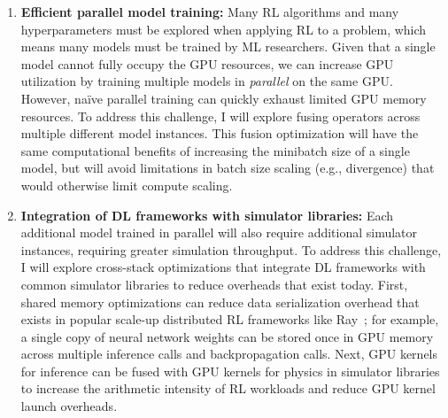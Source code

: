 \documentclass[letterpaper,11pt]{article}
\begin{document}
\begin{enumerate}[leftmargin=*]
	\item \textbf{Efficient parallel model training:} 
            Many RL algorithms and many hyperparameters must be explored when applying RL to a problem, which means many models must be trained by ML researchers.  
            Given that a single model cannot fully occupy the GPU resources, we can increase GPU utilization by training multiple models in \emph{parallel} on the same GPU.  
            However, na\"ive parallel training can quickly exhaust limited GPU memory resources.  
            To address this challenge, I will explore fusing operators across multiple different model instances. 
            This fusion optimization will have the same computational benefits of increasing the minibatch size of a single model,
            but will avoid limitations in batch size scaling (e.g., divergence) that would otherwise limit compute scaling.


        \item \textbf{Integration of DL frameworks with simulator libraries:}
            Each additional model trained in parallel will also require additional simulator instances, requiring greater simulation throughput. 
            To address this challenge, I will explore cross-stack optimizations that integrate DL frameworks with common simulator libraries to reduce overheads that exist today.
            First, shared memory optimizations can reduce data serialization overhead that exists in popular scale-up distributed RL frameworks like Ray~\cite{ray}; for example, a single copy of neural network weights can be stored once in GPU memory across multiple inference calls and backpropagation calls.
            Next, GPU kernels for inference can be fused with GPU kernels for physics in simulator libraries to increase the arithmetic intensity of RL workloads and reduce GPU kernel launch overheads.



\end{enumerate}
\end{document}
